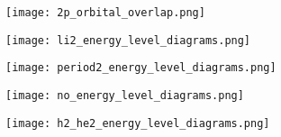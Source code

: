 \begin{mdframed}
\begin{multicols}{2}
\begin{figure}[H]
\centering
\texttt{[image: 2p\_orbital\_overlap.png]}
\end{figure}


\begin{figure}[H]
\centering
\texttt{[image: li2\_energy\_level\_diagrams.png]}
\end{figure}
\begin{figure}[H]
\centering
\texttt{[image: period2\_energy\_level\_diagrams.png]}
\end{figure}
\begin{figure}[H]
\centering
\texttt{[image: no\_energy\_level\_diagrams.png]}
\end{figure}
\end{multicols}
\begin{figure}[H]
\centering
\texttt{[image: h2\_he2\_energy\_level\_diagrams.png]}
\end{figure}
\end{mdframed}






